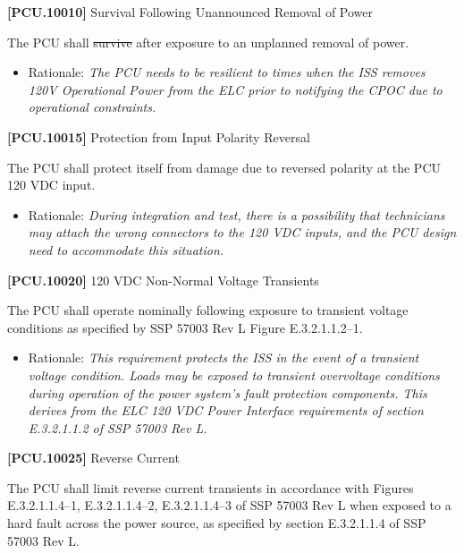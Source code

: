 \documentclass[12pt,oneside,oldfontcommands]{memoir}
\providecommand{\DIFaddtex}[1]{{\protect\color{blue}\uwave{#1}}} %
\providecommand{\DIFdeltex}[1]{{\protect\color{red}\sout{#1}}}                      %
\providecommand{\DIFaddbegin}{} %
\providecommand{\DIFaddend}{} %
\providecommand{\DIFdelbegin}{} %
\providecommand{\DIFdelend}{} %
\providecommand{\DIFadd}[1]{\texorpdfstring{\DIFaddtex{#1}}{#1}} %
\providecommand{\DIFdel}[1]{\texorpdfstring{\DIFdeltex{#1}}{}} %
\newcommand{\DIFscaledelfig}{0.5}
\newlength{\DIFdelgraphicswidth} %
\newlength{\DIFdelgraphicsheight} %
\newcommand{\DIFaddincludegraphics}[2][]{{\color{blue}\fbox{\DIFOincludegraphics[#1]{#2}}}} %
\newcommand{\DIFdelincludegraphics}[2][]{%
\sbox{\DIFdelgraphicsbox}{\DIFOincludegraphics[#1]{#2}}%
\settoboxwidth{\DIFdelgraphicswidth}{\DIFdelgraphicsbox} %
\settoboxtotalheight{\DIFdelgraphicsheight}{\DIFdelgraphicsbox} %
\scalebox{\DIFscaledelfig}{%
\parbox[b]{\DIFdelgraphicswidth}{\usebox{\DIFdelgraphicsbox}\\[-\baselineskip] \rule{\DIFdelgraphicswidth}{0em}}\llap{\resizebox{\DIFdelgraphicswidth}{\DIFdelgraphicsheight}{%
\setlength{\unitlength}{\DIFdelgraphicswidth}%
\begin{picture}(1,1)%
\thicklines\linethickness{2pt} %
{\color[rgb]{1,0,0}\put(0,0){\framebox(1,1){}}}%
{\color[rgb]{1,0,0}\put(0,0){\line( 1,1){1}}}%
{\color[rgb]{1,0,0}\put(0,1){\line(1,-1){1}}}%
\end{picture}%
}\hspace*{3pt}}} %
} %
\DeclareRobustCommand{\DIFaddbegin}{\DIFOaddbegin \let\includegraphics\DIFaddincludegraphics} %
\DeclareRobustCommand{\DIFaddend}{\DIFOaddend \let\includegraphics\DIFOincludegraphics} %
\DeclareRobustCommand{\DIFdelbegin}{\DIFOdelbegin \let\includegraphics\DIFdelincludegraphics} %
\DeclareRobustCommand{\DIFdelend}{\DIFOaddend \let\includegraphics\DIFOincludegraphics} %
\begin{document}
\textbf{[PCU.10010]} Survival Following Unannounced Removal of Power

The \gls{PCU} shall \DIFdelbegin \DIFdel{survive }\DIFdelend \DIFaddbegin \DIFadd{operate nominally }\DIFaddend after exposure to an unplanned removal of power.

\begin{itemize}
\item{} Rationale: \emph{The PCU needs to be resilient to times when the ISS removes 120V Operational Power from the ELC prior to notifying the CPOC due to operational constraints.}

\end{itemize}

\textbf{[PCU.10015]} Protection from Input Polarity Reversal

The \gls{PCU} shall protect itself from damage due to reversed polarity at the \gls{PCU} 120 \gls{VDC} input.

\begin{itemize}
\item{} Rationale: \emph{During integration and test, there is a possibility that technicians may attach the wrong connectors to the 120 VDC inputs, and the PCU design need to accommodate this situation.}

\end{itemize}

\textbf{[PCU.10020]} 120 \gls{VDC} Non-Normal Voltage Transients

The \gls{PCU} shall operate nominally following exposure to transient voltage conditions as specified by SSP 57003 Rev L Figure E.3.2.1.1.2--1.

\begin{itemize}
\item{} Rationale: \emph{This requirement protects the ISS in the event of a transient voltage condition. Loads may be exposed to transient overvoltage conditions during operation of the power system's fault protection components. This derives from the ELC 120 VDC Power Interface requirements of section E.3.2.1.1.2 of SSP 57003 Rev L.}

\end{itemize}

\textbf{[PCU.10025]} Reverse Current

The \gls{PCU} shall limit reverse current transients in accordance with Figures E.3.2.1.1.4--1, E.3.2.1.1.4--2, E.3.2.1.1.4--3 of SSP 57003 Rev L when exposed to a hard fault across the power source, as specified by section E.3.2.1.1.4 of SSP 57003 Rev L.
\end{document}
